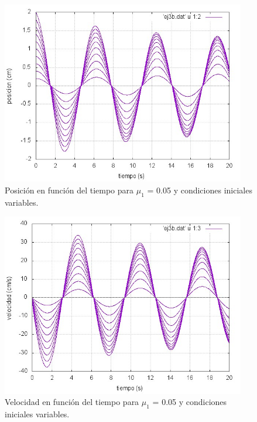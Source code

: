 \documentclass[a4paper,12pt]{article}
\begin{document}
\begin{itemize}
\begin{figure}[H]
\begin{center}
\includegraphics[height=8cm]{grafico_ej3b_xVSt.jpg}
\caption[width=5cm]{Posici\'on en funci\'on del tiempo para $\mu_1$ = 0.05 y condiciones iniciales variables.}
\end{center}
\end{figure}

\begin{figure}[H]
\begin{center}
\includegraphics[height=8cm]{grafico_ej3b_vVSt.jpg}
\caption[width=5cm]{Velocidad en funci\'on del tiempo para $\mu_1$ = 0.05 y condiciones iniciales variables.}
\end{center}
\end{figure}


\end{itemize}
\end{document}
